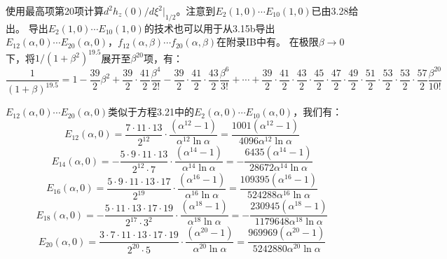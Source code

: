 使用最高项第20项计算$d^2 h_z(0)/d\xi^2|_{1/2}$。注意到$E_2(1, 0)\cdots E_{10}(1, 0)$已由3.28给出。
导出$E_2(1, 0)\cdots E_{10}(1, 0)$的技术也可以用于从3.15b导出$E_{12}(\alpha, 0)\cdots E_{20}(\alpha, 0)$，$f_{12}(\alpha,\beta)\cdots f_{20}(\alpha,\beta)$在附录IB中有。
在极限$\beta\rightarrow 0$下，将$1/(1+\beta^2)^{19.5}$展开至$\beta^{20}$项，有：
\begin{equation}%
\frac{1}{(1+\beta)^{19.5}}=1-\frac{39}{2}\beta^2+\frac{39}{2}\cdot\frac{41}{2}\frac{\beta^4}{2!}-\frac{39}{2}\cdot\frac{41}{2}\cdot\frac{43}{2}\frac{\beta^6}{3!}+\cdots
+\frac{39}{2}\cdot\frac{41}{2}\cdot\frac{43}{2}\cdot\frac{45}{2}\cdot\frac{47}{2}\cdot\frac{49}{2}\cdot\frac{51}{2}\cdot\frac{53}{2}
\cdot\frac{53}{2}\cdot\frac{57}{2}\frac{\beta^{20}}{10!}
\end{equation}

$E_{12}(\alpha, 0)\cdots E_{20}(\alpha, 0)$类似于方程3.21中的$E_{2}(\alpha, 0)\cdots E_{10}(\alpha, 0)$，我们有：
\begin{equation}%
E_{12}(\alpha,0)=\frac{7\cdot11\cdot13}{2^{12}}\cdot\frac{(\alpha^{12}-1)}{\alpha^{12}\ln\alpha}=\frac{1001(\alpha^{12}-1)}{4096\alpha^{12}\ln\alpha}
\end{equation}
\begin{equation}%
E_{14}(\alpha,0)=-\frac{5\cdot9\cdot11\cdot13}{2^{12}\cdot7}\cdot\frac{(\alpha^{14}-1)}{\alpha^{14}\ln\alpha}=-\frac{6435(\alpha^{14}-1)}{28672\alpha^{14}\ln\alpha}
\end{equation}
\begin{equation}%
E_{16}(\alpha,0)=\frac{5\cdot9\cdot11\cdot13\cdot17}{2^{19}}\cdot\frac{(\alpha^{16}-1)}{\alpha^{16}\ln\alpha}=\frac{109395(\alpha^{16}-1)}{524288\alpha^{16}\ln\alpha}
\end{equation}
\begin{equation}%
E_{18}(\alpha,0)=-\frac{5\cdot11\cdot13\cdot17\cdot19}{2^{17}\cdot3^2}\cdot\frac{(\alpha^{18}-1)}{\alpha^{18}\ln\alpha}=-\frac{230945(\alpha^{18}-1)}{1179648\alpha^{18}\ln\alpha}
\end{equation}
\begin{equation}%
E_{20}(\alpha,0)=\frac{3\cdot7\cdot11\cdot13\cdot17\cdot19}{2^{20}\cdot5}\cdot\frac{(\alpha^{20}-1)}{\alpha^{20}\ln\alpha}=\frac{969969(\alpha^{20}-1)}{5242880\alpha^{20}\ln\alpha}
\end{equation}


